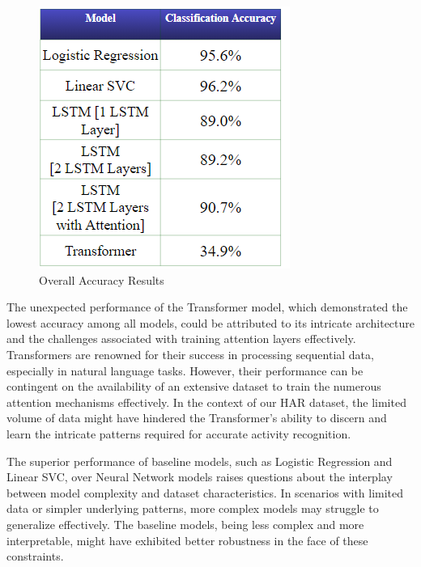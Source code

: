 \documentclass[11pt]{article}
\begin{document}
\begin{figure}[h!]
    \centering
    \includegraphics[width= 0.9 \linewidth]{results_IOT.png}
    \caption{Overall Accuracy Results}
    \label{results_IOT.png}
\end{figure}
The unexpected performance of the Transformer model, which demonstrated the lowest accuracy among all models, could be attributed to its intricate architecture and the challenges associated with training attention layers effectively. Transformers are renowned for their success in processing sequential data, especially in natural language tasks. However, their performance can be contingent on the availability of an extensive dataset to train the numerous attention mechanisms effectively. In the context of our HAR dataset, the limited volume of data might have hindered the Transformer's ability to discern and learn the intricate patterns required for accurate activity recognition.

The superior performance of baseline models, such as Logistic Regression and Linear SVC, over Neural Network models raises questions about the interplay between model complexity and dataset characteristics. In scenarios with limited data or simpler underlying patterns, more complex models may struggle to generalize effectively. The baseline models, being less complex and more interpretable, might have exhibited better robustness in the face of these constraints.
\end{document}
